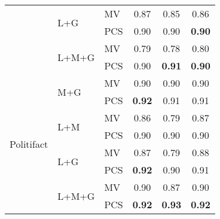{\begin{tabular}{lllccc}
& \multirow{2}{*}{L+G} & MV & 0.87& 0.85&0.86 \\
&&  PCS &0.90 &0.90 &\cellcolor{cyan!20} \textbf{0.90} \\
& \multirow{2}{*}{L+M+G} & MV & 0.79 & 0.78 &0.80 \\
&&  PCS & 0.90 & \cellcolor{cyan!20}\textbf{0.91} &\cellcolor{cyan!20} \textbf{0.90}\\
\hline
\multirow{8}{*}{\centering Politifact}
& \multirow{2}{*}{M+G} & MV & 0.90  & 0.90&0.90 \\
&& PCS & \cellcolor{cyan!20}\textbf{0.92} & 0.91&0.91\\
& \multirow{2}{*}{L+M} & MV & 0.86 & 0.79 &0.87\\
&& PCS & 0.90& 0.90&0.90 \\
& \multirow{2}{*}{L+G} & MV & 0.87& 0.79 &0.88\\
&& PCS & \cellcolor{cyan!20}\textbf{0.92} &0.90&0.91 \\
& \multirow{2}{*}{L+M+G} & MV & 0.90& 0.87 &0.90\\
&& PCS & \cellcolor{cyan!20} \textbf{0.92} & \cellcolor{cyan!20} \textbf{0.93}  & \cellcolor{cyan!20} 
 \textbf{0.92}\\
\bottomrule
\end{tabular}
}

